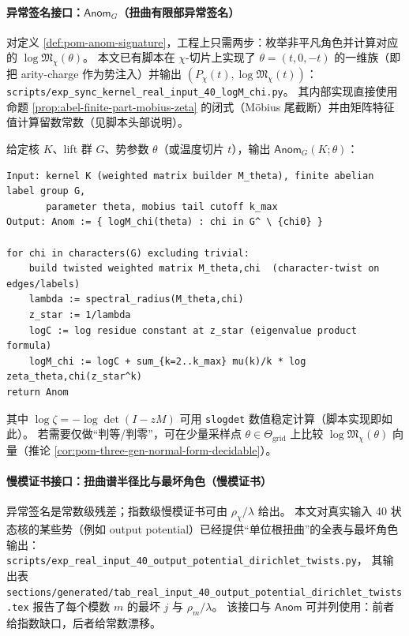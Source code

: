 \paragraph{异常签名接口：\texorpdfstring{$\mathsf{Anom}_G$}{Anom}（扭曲有限部异常签名）}
对定义 \ref{def:pom-anom-signature}，工程上只需两步：枚举非平凡角色并计算对应的 \(\log\mathfrak{M}_\chi(\theta)\)。
本文已有脚本在 \(\chi\)-切片上实现了 \(\theta=(t,0,-t)\) 的一维族（即把 arity-charge 作为势注入）并输出 \((P_\chi(t),\log\mathfrak{M}_\chi(t))\)：
\texttt{scripts/exp\_sync\_kernel\_real\_input\_40\_logM\_chi.py}。
其内部实现直接使用命题 \ref{prop:abel-finite-part-mobius-zeta} 的闭式（Möbius 尾截断）并由矩阵特征值计算留数常数（见脚本头部说明）。

\begin{remark}\label{rem:pom-anom-pseudocode}
给定核 \(K\)、lift 群 \(G\)、势参数 \(\theta\)（或温度切片 \(t\)），输出 \(\mathsf{Anom}_G(K;\theta)\)：
\begin{verbatim}
Input: kernel K (weighted matrix builder M_theta), finite abelian label group G,
       parameter theta, mobius tail cutoff k_max
Output: Anom := { logM_chi(theta) : chi in G^ \ {chi0} }

for chi in characters(G) excluding trivial:
    build twisted weighted matrix M_theta,chi  (character-twist on edges/labels)
    lambda := spectral_radius(M_theta,chi)
    z_star := 1/lambda
    logC := log residue constant at z_star (eigenvalue product formula)
    logM_chi := logC + sum_{k=2..k_max} mu(k)/k * log zeta_theta,chi(z_star^k)
return Anom
\end{verbatim}
其中 \(\log\zeta=-\log\det(I-zM)\) 可用 \texttt{slogdet} 数值稳定计算（脚本实现即如此）。
若需要仅做“判等/判零”，可在少量采样点 \(\theta\in\Theta_{\mathrm{grid}}\) 上比较 \(\log\mathfrak{M}_\chi(\theta)\) 向量（推论 \ref{cor:pom-three-gen-normal-form-decidable}）。
\end{remark}

\paragraph{慢模证书接口：扭曲谱半径比与最坏角色（慢模证书）}
异常签名是常数级残差；指数级慢模证书可由 \(\rho_\chi/\lambda\) 给出。
本文对真实输入 40 状态核的某些势（例如 output potential）已经提供“单位根扭曲”的全表与最坏角色输出：
\texttt{scripts/exp\_real\_input\_40\_output\_potential\_dirichlet\_twists.py}，
其输出表 \texttt{sections/generated/tab\_real\_input\_40\_output\_potential\_dirichlet\_twists.tex}
报告了每个模数 \(m\) 的最坏 \(j\) 与 \(\rho_m/\lambda\)。
该接口与 \(\mathsf{Anom}\) 可并列使用：前者给指数缺口，后者给常数漂移。

